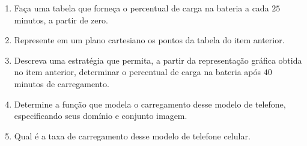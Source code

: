 \documentclass[10 pt,usenames,dvipsnames, oneside]{article}
\begin{document}
\begin{enumerate}
\item {} 
Faça uma tabela que forneça o percentual de carga na bateria a cada \(25\) minutos, a partir de zero.

\item {} 
Represente em um plano cartesiano os pontos da tabela do item anterior.

\item {} 
Descreva uma estratégia que permita, a partir da representação gráfica obtida no item anterior, determinar o percentual de carga na bateria após \(40\) minutos de carregamento.

\item {} 
Determine a função que modela o carregamento desse modelo de telefone, especificando seus domínio e conjunto imagem.

\item {} 
Qual é a taxa de carregamento desse modelo de telefone celular.
\end{enumerate}
\end{document}
